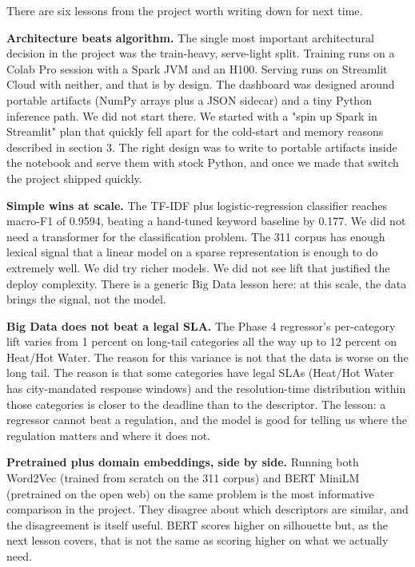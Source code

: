 \documentclass[11pt,letterpaper]{article}
\begin{document}
There are six lessons from the project worth writing down for next time.

\textbf{Architecture beats algorithm.} The single most important architectural decision in the project was the train-heavy, serve-light split. Training runs on a Colab Pro session with a Spark JVM and an H100. Serving runs on Streamlit Cloud with neither, and that is by design. The dashboard was designed around portable artifacts (NumPy arrays plus a JSON sidecar) and a tiny Python inference path. We did not start there. We started with a "spin up Spark in Streamlit" plan that quickly fell apart for the cold-start and memory reasons described in section 3. The right design was to write to portable artifacts inside the notebook and serve them with stock Python, and once we made that switch the project shipped quickly.

\textbf{Simple wins at scale.} The TF-IDF plus logistic-regression classifier reaches macro-F1 of 0.9594, beating a hand-tuned keyword baseline by 0.177. We did not need a transformer for the classification problem. The 311 corpus has enough lexical signal that a linear model on a sparse representation is enough to do extremely well. We did try richer models. We did not see lift that justified the deploy complexity. There is a generic Big Data lesson here: at this scale, the data brings the signal, not the model.

\textbf{Big Data does not beat a legal SLA.} The Phase 4 regressor's per-category lift varies from 1 percent on long-tail categories all the way up to 12 percent on Heat/Hot Water. The reason for this variance is not that the data is worse on the long tail. The reason is that some categories have legal SLAs (Heat/Hot Water has city-mandated response windows) and the resolution-time distribution within those categories is closer to the deadline than to the descriptor. The lesson: a regressor cannot beat a regulation, and the model is good for telling us where the regulation matters and where it does not.

\textbf{Pretrained plus domain embeddings, side by side.} Running both Word2Vec (trained from scratch on the 311 corpus) and BERT MiniLM (pretrained on the open web) on the same problem is the most informative comparison in the project. They disagree about which descriptors are similar, and the disagreement is itself useful. BERT scores higher on silhouette but, as the next lesson covers, that is not the same as scoring higher on what we actually need.
\end{document}

